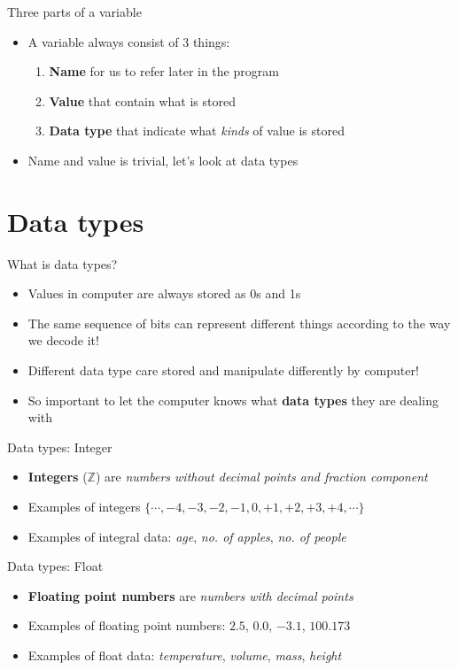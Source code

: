 \documentclass[10pt,xcolor={table,dvipsnames},t]{beamer}
\begin{document}
\begin{frame}{Three parts of a variable}
  \begin{itemize}
    \item A variable always consist of 3 things:
    \begin{enumerate}
      \item \textbf{Name} for us to refer later in the program 
      \item \textbf{Value} that contain what is stored
      \item \textbf{Data type} that indicate what \textit{kinds} of value is stored
    \end{enumerate}
    \item Name and value is trivial, let's look at data types
  \end{itemize}
\end{frame}

\section{Data types}
\begin{frame}{What is data types?}
  \begin{itemize}
    \item Values in computer are always stored as 0s and 1s 
    \item The same sequence of bits can represent different things according to the way we decode it!
    \item Different data type care stored and manipulate differently by computer!
    \item So important to let the computer knows what \textbf{data types} they are dealing with
  \end{itemize}
\end{frame}

\begin{frame}{Data types: Integer}
  \begin{itemize}
    \item \textbf{Integers} ($\mathbb{Z}$) are \textit{numbers without decimal points and fraction component}
    \item  Examples of integers $\{\cdots, -4, -3, -2, -1 , 0, +1, +2, +3, +4, \cdots\}$
    \item Examples of integral data: \textit{age}, \textit{no. of apples}, \textit{no. of people}
  \end{itemize}
\end{frame}

\begin{frame}{Data types: Float}
  \begin{itemize}
    \item \textbf{Floating point numbers} are \textit{numbers with decimal points}
    \item  Examples of floating point numbers: $2.5$, $0.0$, $-3.1$, $100.173$
    \item Examples of float data: \textit{temperature}, \textit{volume}, \textit{mass}, \textit{height}
  \end{itemize}
\end{frame}
\end{document}
